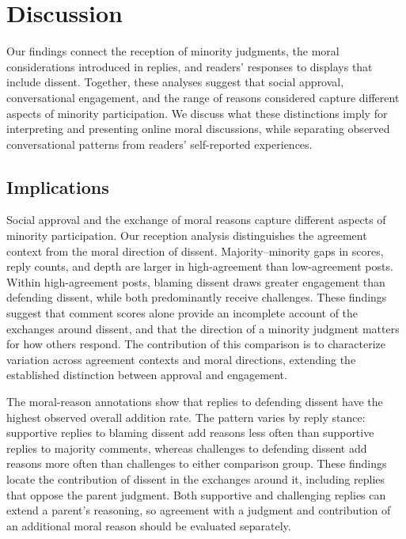 \section{Discussion}
\label{sec:discussion}

Our findings connect the reception of minority judgments, the moral
considerations introduced in replies, and readers' responses to displays
that include dissent. Together, these analyses suggest that social approval,
conversational engagement, and the range of reasons considered capture
different aspects of minority participation. We discuss what these
distinctions imply for interpreting and presenting online moral discussions,
while separating observed conversational patterns from readers'
self-reported experiences.

\subsection{Implications}
\label{subsec:discussion-findings}

Social approval and the exchange of moral reasons capture different aspects
of minority participation. Our reception analysis distinguishes the
agreement context from the moral direction of dissent. Majority--minority
gaps in scores, reply counts, and depth are larger in high-agreement
than low-agreement posts. Within high-agreement posts, blaming dissent
draws greater engagement than defending dissent, while
both predominantly receive challenges. These findings suggest that
comment scores alone provide an incomplete account of the exchanges
around dissent, and that the direction of a minority judgment matters
for how others respond. The contribution of this comparison is to
characterize variation across agreement contexts and moral directions,
extending the established distinction between approval and engagement.

The moral-reason annotations show that replies to defending dissent have
the highest observed overall addition rate. The pattern varies by reply
stance: supportive replies to blaming dissent add reasons less often than
supportive replies to majority comments, whereas challenges to defending
dissent add reasons more often than challenges to either comparison group.
These findings locate the contribution of dissent in the exchanges around
it, including replies that oppose the parent judgment. Both supportive and
challenging replies can extend a parent's reasoning, so agreement with a
judgment and contribution of an additional moral reason should be evaluated
separately.

